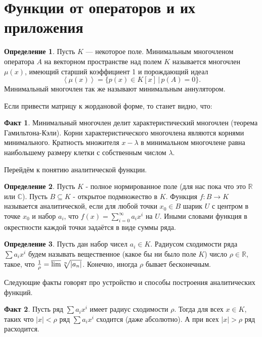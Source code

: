 \documentclass[10pt,a4paper,oneside]{book}
\theoremstyle{definition}
\newtheorem{defn}{Определение}
\newtheorem*{fact}{Факт}
\newcommand{\mb}[1]{\mathbb{#1}}
\def\lan{\left\langle }
\def\ran{\right\rangle}
\begin{document}
\section{Функции от операторов и их приложения}


\begin{defn}
Пусть $K$ --- некоторое поле.  Минимальным многочленом оператора $A$ на векторном пространстве над полем $K$ называется многочлен $\mu(x)$, имеющий старший коэффициент 1 и порождающий идеал $$\lan \mu(x) \ran =\{ p(x)\in K[x] \, | \, p(A)=0\}.$$
Минимальный многочлен так же называют минимальным аннулятором.
\end{defn}


Если привести матрицу к жордановой форме, то станет видно, что:

\begin{fact}
Минимальный многочлен делит характеристический многочлен (теорема Гамильтона-Кэли). Корни характеристического многочлена являются корнями минимального. Кратность множителя $x-\lambda$ в минимальном многочлене равна наибольшему размеру клетки с собственным числом $\lambda$.
\end{fact}

Перейдём к понятию аналитической функции. 

\begin{defn}
Пусть $K$ - полное нормированное поле (для нас пока что это $\mb R$ или $\mb C$). Пусть $B\subseteq K$ - открытое подмножество в $K$. Функция $f\colon B \to K$ называется аналитической, если для любой точки $x_0\in B$ шарик $U$ с центром в точке $x_0$ и  набор $a_i$, что $f(x)=\sum_{i=0}^{\infty} a_i x^i$ на  $U$. Иными словами функция в окрестности каждой точки задаётся в виде суммы ряда.
\end{defn}

\begin{defn}
Пусть дан набор чисел $a_i\in K$. Радиусом сходимости ряда $\sum a_i x^i$ будем называть вещественное (какое бы ни было поле $K$) число $\rho \in \mb R$, такое, что $\frac{1}{\rho}=\varlimsup \sqrt[n]{|a_n|}$. Конечно, иногда $\rho$ бывает бесконечным.
\end{defn}

Следующие факты говорят про устройство и способы построения аналитических функций.
\begin{fact}
Пусть ряд $\sum a_i x^i$ имеет радиус сходимости $\rho$. Тогда для всех $x\in K$, таких что $|x|<\rho$ ряд $\sum a_i x^i$ сходится (даже абсолютно). А при всех $|x|>\rho$ ряд расходится.
\end{fact}
\end{document}

